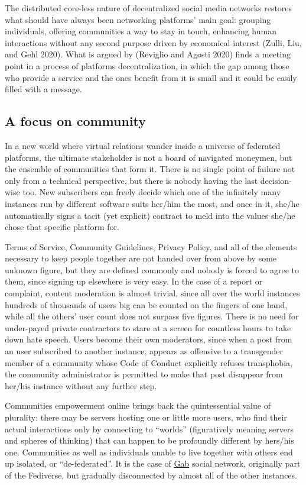 \documentclass[
  a4paper,
]{book}
\begin{document}
The distributed core-less nature of decentralized social media networks restores what should have always been networking platforms' main goal: grouping individuals, offering communities a way to stay in touch, enhancing human interactions without any second purpose driven by economical interest {(Zulli, Liu, and Gehl 2020)}. What is argued by {(Reviglio and Agosti 2020)} finds a meeting point in a process of platforms decentralization, in which the gap among those who provide a service and the ones benefit from it is small and it could be easily filled with a message.

\hypertarget{a-focus-on-community}{%
\subsection{A focus on community}\label{a-focus-on-community}}

In a new world where virtual relations wander inside a universe of federated platforms, the ultimate stakeholder is not a board of navigated moneymen, but the ensemble of communities that form it. There is no single point of failure not only from a technical perspective, but there is nobody having the last decision-wise too. New subscribers can freely decide which one of the infinitely many instances run by different software suits her/him the most, and once in it, she/he automatically signs a tacit (yet explicit) contract to meld into the values she/he chose that specific platform for.

Terms of Service, Community Guidelines, Privacy Policy, and all of the elements necessary to keep people together are not handed over from above by some unknown figure, but they are defined commonly and nobody is forced to agree to them, since signing up elsewhere is very easy. In the case of a report or complaint, content moderation is almost trivial, since all over the world instances hundreds of thousands of users big can be counted on the fingers of one hand, while all the others' user count does not surpass five figures. There is no need for under-payed private contractors to stare at a screen for countless hours to take down hate speech. Users become their own moderators, since when a post from an user subscribed to another instance, appears as offensive to a transgender member of a community whose Code of Conduct explicitly refuses transphobia, the community administrator is permitted to make that post disappear from her/his instance without any further step.

Communities empowerment online brings back the quintessential value of plurality: there may be servers hosting one or little more users, who find their actual interactions only by connecting to ``worlds'' (figuratively meaning servers and spheres of thinking) that can happen to be profoundly different by hers/his one. Communities as well as individuals unable to live together with others end up isolated, or ``de-federated''. It is the case of \href{https://gab.com/}{Gab} social network, originally part of the Fediverse, but gradually disconnected by almost all of the other instances.
\end{document}
